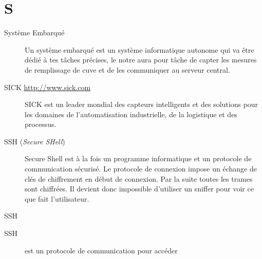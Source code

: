 \section{S}

\begin{description}

\item[Système Embarqué] Un système embarqué est un système informatique autonome
qui va être dédié à tes tâches précises, le notre aura pour tâche de capter les 
mesures de remplissage de cuve et de les communiquer au serveur central.

\item[SICK \url{http://www.sick.com}]
SICK est un leader mondial des capteurs intelligents et des solutions pour les domaines de l’automatisation industrielle, de la logistique et des processus.

\item[SSH (\textsl{Secure SHell})]
Secure Shell est à la fois un programme informatique et un protocole de communication sécurisé. Le protocole de connexion impose un échange de clés de chiffrement en début de connexion. Par la suite toutes les trames sont chiffrées. Il devient donc impossible d'utiliser un sniffer pour voir ce que fait l'utilisateur.

\end{description}

SSH

\begin{description}

\item[SSH] est un protocole de communication pour accéder 


\end{description}


